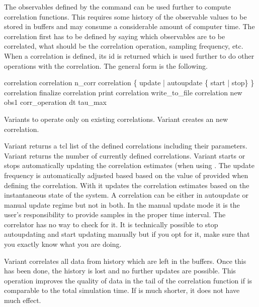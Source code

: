The observables defined by the  command can be used further 
to compute correlation functions. This requires some history of the observable values
to be stored in buffers and may consume a considerable amount of computer time.
The correlation first has to be defined by saying which observables 
are to be correlated, what should be the correlation operation, sampling
frequency, etc. When a correlation is defined, its id is returned which is
used further to do other operations with the correlation.
The general form is the following.
\begin{essyntax}
   correlation 
   correlation n_corr
   correlation  \{ update | autoupdate \{ start | stop\}  \}
   correlation  finalize
   correlation  print 
   correlation  write_to_file 
   correlation new obs1   corr_operation  dt  tau_max   
\end{essyntax}

Variants  to  operate only on existing
correlations. Variant creates an new correlation.
  
Variant  returns a tcl list of the defined correlations
including their parameters.    Variant  returns the number of currently
defined correlations.  Variant  starts or stops
automatically updating the correlation estimates (when using
. The update frequency is
automatically adjusted based based on the value of  provided
when defining the correlation.  With  it updates the
correlation estimates based on the instantaneous state of the system.
A correlation can be either in autoupdate or manual update regime but
not in both.  In the manual update mode it is the user's
responsibility to provide samples in the proper time interval. The
correlator has no way to check for it.  It is technically possible to
stop autoupdating and start updating manually but if you opt for it,
make sure that you exactly know what you are doing.

Variant  correlates all data from history which are left in
the buffers. Once this has been done, the history is lost and no
further updates are possible. This operation improves the quality of
data in the tail of the  
correlation function if  is comparable to the total
simulation time. If  is much shorter, it does not
have much effect.


